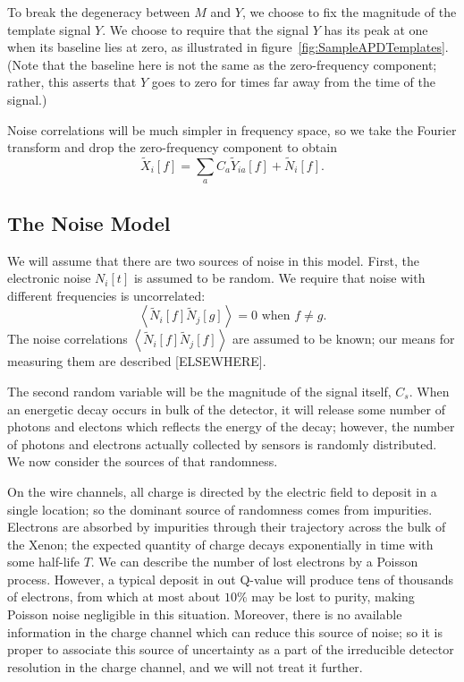To break the degeneracy between $M$ and $Y$, we choose to fix the magnitude of the template signal $Y$.  We choose to require that the signal $Y$ has its peak at one when its baseline lies at zero, as illustrated in figure~\ref{fig:SampleAPDTemplates}.  (Note that the baseline here is not the same as the zero-frequency component; rather, this asserts that $Y$ goes to zero for times far away from the time of the signal.)

Noise correlations will be much simpler in frequency space, so we take the Fourier transform and drop the zero-frequency component to obtain \[\widetilde{X}_i[f] = \sum_a C_{a}\widetilde{Y}_{ia}[f] + \widetilde{N}_i[f].\]

\subsection{The Noise Model}

We will assume that there are two sources of noise in this model.  First, the electronic noise $N_i[t]$ is assumed to be random.  We require that noise with different frequencies is uncorrelated:
\[\left< \widetilde{N}_i[f] \widetilde{N}_j[g] \right> = 0 \text{~when~} f \ne g.\]
The noise correlations $\left< \widetilde{N}_i[f] \widetilde{N}_j[f] \right>$ are assumed to be known; our means for measuring them are described [ELSEWHERE].

The second random variable will be the magnitude of the signal itself, $C_s$.  When an energetic decay occurs in bulk of the detector, it will release some number of photons and electons which reflects the energy of the decay; however, the number of photons and electrons actually collected by sensors is randomly distributed.  We now consider the sources of that randomness.

On the wire channels, all charge is directed by the electric field to deposit in a single location; so the dominant source of randomness comes from impurities.  Electrons are absorbed by impurities through their trajectory across the bulk of the Xenon; the expected quantity of charge decays exponentially in time with some half-life $T$.  We can describe the number of lost electrons by a Poisson process.  However, a typical deposit in out Q-value will produce tens of thousands of electrons, from which at most about $10\%$ may be lost to purity, making Poisson noise negligible in this situation.  Moreover, there is no available information in the charge channel which can reduce this source of noise; so it is proper to associate this source of uncertainty as a part of the irreducible detector resolution in the charge channel, and we will not treat it further.

